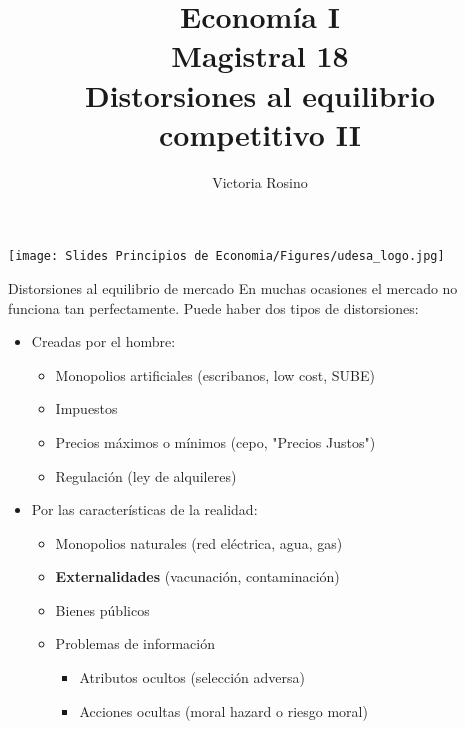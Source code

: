 \documentclass{beamer}
\title[Economía I]{Economía I \vspace{3mm}
\\ Magistral 18 \vspace{3mm} \\ Distorsiones al equilibrio competitivo II}
\date{}
\author[Victoria Rosino]{Victoria Rosino}
\institute[]{Universidad de San Andrés}
\begin{document}
\begin{frame}
\vspace{0.3cm}
\titlepage
\centering
\vspace{-0.9cm}
\texttt{[image: Slides Principios de Economia/Figures/udesa\_logo.jpg]} 
\end{frame}


\begin{frame}{Distorsiones al equilibrio de mercado}
    En muchas ocasiones el mercado no funciona tan perfectamente. Puede haber dos tipos de distorsiones: \vspace{1mm}
    \begin{itemize}
        \item Creadas por el hombre:
        \begin{itemize}
            \item Monopolios artificiales (escribanos, low cost, SUBE)
             \vspace{1mm}
             \item Impuestos
             \vspace{1mm}
            \item Precios máximos o mínimos (cepo, "Precios Justos")
             \vspace{1mm}
            \item Regulación (ley de alquileres)
        \end{itemize}
        \vspace{1mm}
        \item Por las características de la realidad:
        \begin{itemize}
            \item Monopolios naturales (red eléctrica, agua, gas)   
             \vspace{1mm}
            \item \textbf{Externalidades} (vacunación, contaminación)
             \vspace{1mm}
            \item Bienes públicos
            \vspace{1mm}
            \item Problemas de información
            \begin{itemize}
                \item Atributos ocultos (selección adversa)
                 \vspace{1mm}
                \item Acciones ocultas (moral hazard o riesgo moral)
            \end{itemize}        
        \end{itemize}
    \end{itemize}
\end{frame}
\end{document}
